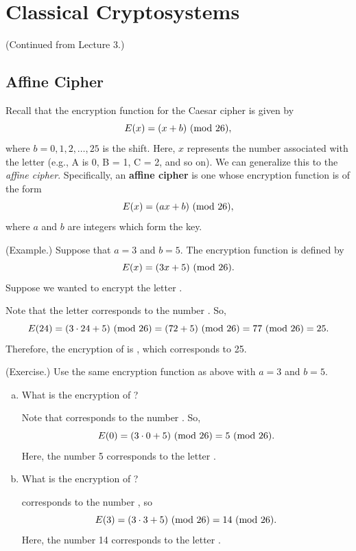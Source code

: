 \documentclass[letterpaper]{article}
\begin{document}
\section{Classical Cryptosystems}
(Continued from Lecture 3.)

\subsection{Affine Cipher}
Recall that the encryption function for the Caesar cipher is given by \[E(x) = (x + b) \ (\mathrm{mod}\ 26),\] where $b = 0, 1, 2, \hdots, 25$ is the shift. Here, $x$ represents the number associated with the letter (e.g., A is 0, B = 1, C = 2, and so on). We can generalize this to the \emph{affine cipher}. Specifically, an \textbf{affine cipher} is one whose encryption function is of the form \[E(x) = (ax + b) \ (\mathrm{mod}\ 26),\] where $a$ and $b$ are integers which form the key. 

\bigskip 

\begin{mdframed}
    (Example.) Suppose that $a = 3$ and $b = 5$. The encryption function is defined by \[E(x) = (3x + 5) \ (\mathrm{mod}\ 26).\] Suppose we wanted to encrypt the letter . 

    \bigskip 

    Note that the letter  corresponds to the number . So, 
    \[E(24) = (3 \cdot 24 + 5) \ (\mathrm{mod}\ 26) = (72 + 5) \ (\mathrm{mod}\ 26) = 77 \ (\mathrm{mod}\ 26) = 25.\]
    Therefore, the encryption of  is , which corresponds to 25.
\end{mdframed}

\begin{mdframed}
    (Exercise.) Use the same encryption function as above with $a = 3$ and $b = 5$.

    \begin{enumerate}[(a)]
        \item What is the encryption of ?
        \begin{mdframed}
            Note that  corresponds to the number . So, 
            \[E(0) = (3 \cdot 0 + 5) \ (\mathrm{mod}\ 26) = 5 \ (\mathrm{mod}\ 26).\]
            Here, the number 5 corresponds to the letter .
        \end{mdframed}
        \item What is the encryption of ?
        \begin{mdframed}
             corresponds to the number , so 
            \[E(3) = (3 \cdot 3 + 5) \ (\mathrm{mod}\ 26) = 14 \ (\mathrm{mod}\ 26).\]
            Here, the number 14 corresponds to the letter .
        \end{mdframed}
    \end{enumerate}
\end{mdframed}
\end{document}
